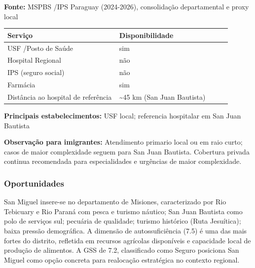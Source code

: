 \textbf{Fonte:} MSPBS /\allowbreak  IPS Paraguay (2024-2026), consolidação
departamental e proxy local

{\def\LTcaptype{none} %
\begin{longtable}{@{}>{\raggedright\arraybackslash}p{0.45\linewidth} >{\raggedright\arraybackslash}p{0.45\linewidth}@{}}
\toprule\noalign{}
Serviço & Disponibilidade \\
\midrule\noalign{}
\endhead
\bottomrule\noalign{}
\endlastfoot
USF /\allowbreak  Posto de Saúde & sim \\
Hospital Regional & não \\
IPS (seguro social) & não \\
Farmácia & sim \\
Distância ao hospital de referência & \textasciitilde45 km (San Juan
Bautista) \\
\end{longtable}
}

\textbf{Principais estabelecimentos:} USF local; referencia hospitalar
em San Juan Bautista

\textbf{Observação para imigrantes:} Atendimento primario local ou em
raio curto; casos de maior complexidade seguem para San Juan Bautista.
Cobertura privada continua recomendada para especialidades e urgências
de maior complexidade.
\newpage

\subsubsection*{Oportunidades}\label{oport-san-miguel-0804}
San Miguel insere-se no departamento de Misiones, caracterizado por Rio Tebicuary e Rio Paraná com pesca e turismo náutico; San Juan Bautista como polo de serviços sul; pecuária de qualidade; turismo histórico (Ruta Jesuítica); baixa pressão demográfica. A dimensão de autossuficiência (7.5) é uma das mais fortes do distrito, refletida em recursos agrícolas disponíveis e capacidade local de produção de alimentos. A GSS de 7.2, classificado como Seguro posiciona San Miguel como opção concreta para realocação estratégica no contexto regional.


